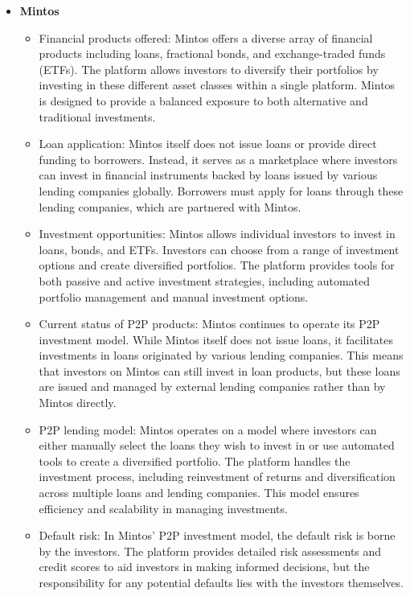 \documentclass{article}
\begin{document}
\begin{itemize}
        \item \textbf{Mintos}
        \begin{itemize}
            \item Financial products offered: Mintos offers a diverse array of financial products including loans, fractional bonds, and exchange-traded funds (ETFs). The platform allows investors to diversify their portfolios by investing in these different asset classes within a single platform. Mintos is designed to provide a balanced exposure to both alternative and traditional investments.
            \item Loan application: Mintos itself does not issue loans or provide direct funding to borrowers. Instead, it serves as a marketplace where investors can invest in financial instruments backed by loans issued by various lending companies globally. Borrowers must apply for loans through these lending companies, which are partnered with Mintos.
            \item Investment opportunities: Mintos allows individual investors to invest in loans, bonds, and ETFs. Investors can choose from a range of investment options and create diversified portfolios. The platform provides tools for both passive and active investment strategies, including automated portfolio management and manual investment options.
            \item Current status of P2P products: Mintos continues to operate its P2P investment model. While Mintos itself does not issue loans, it facilitates investments in loans originated by various lending companies. This means that investors on Mintos can still invest in loan products, but these loans are issued and managed by external lending companies rather than by Mintos directly.
            \item P2P lending model: Mintos operates on a model where investors can either manually select the loans they wish to invest in or use automated tools to create a diversified portfolio. The platform handles the investment process, including reinvestment of returns and diversification across multiple loans and lending companies. This model ensures efficiency and scalability in managing investments.
            \item Default risk: In Mintos’ P2P investment model, the default risk is borne by the investors. The platform provides detailed risk assessments and credit scores to aid investors in making informed decisions, but the responsibility for any potential defaults lies with the investors themselves.
        \end{itemize}  


\end{itemize}
\end{document}
